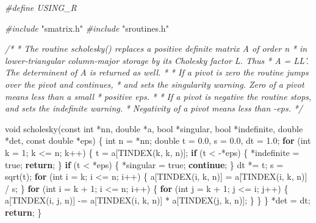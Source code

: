 \documentclass[12pt,]{article}
\newenvironment{Shaded}{\begin{snugshade}}{\end{snugshade}}
\newcommand{\CommentTok}[1]{\textcolor[rgb]{0.56,0.35,0.01}{\textit{#1}}}
\newcommand{\ControlFlowTok}[1]{\textcolor[rgb]{0.13,0.29,0.53}{\textbf{#1}}}
\newcommand{\DataTypeTok}[1]{\textcolor[rgb]{0.13,0.29,0.53}{#1}}
\newcommand{\DecValTok}[1]{\textcolor[rgb]{0.00,0.00,0.81}{#1}}
\newcommand{\FloatTok}[1]{\textcolor[rgb]{0.00,0.00,0.81}{#1}}
\newcommand{\ImportTok}[1]{#1}
\newcommand{\NormalTok}[1]{#1}
\newcommand{\PreprocessorTok}[1]{\textcolor[rgb]{0.56,0.35,0.01}{\textit{#1}}}
\begin{document}
\begin{Shaded}
\begin{Highlighting}[]
\PreprocessorTok{#define USING_R}

\PreprocessorTok{#include }\ImportTok{"smatrix.h"}
\PreprocessorTok{#include }\ImportTok{"sroutines.h"}

\CommentTok{/*}
\CommentTok{ * The routine scholesky() replaces a positive definite matrix A of order n}
\CommentTok{ * in lower-triangular column-major storage by its Cholesky factor L. Thus}
\CommentTok{ * A = LL'. The determinent of A is returned as well.}
\CommentTok{ *}
\CommentTok{ * If a pivot is zero the routine jumps over the pivot and continues,}
\CommentTok{ * and sets the singularity warning. Zero of a pivot means less than a small}
\CommentTok{ * positive eps.}
\CommentTok{ *}
\CommentTok{ * If a pivot is negative the routine stops, and sets the indefinite warning.}
\CommentTok{ * Negativity of a pivot means less than -eps.}
\CommentTok{ */}

\DataTypeTok{void}\NormalTok{ scholesky(}\DataTypeTok{const} \DataTypeTok{int}\NormalTok{ *nn, }\DataTypeTok{double}\NormalTok{ *a, }\DataTypeTok{bool}\NormalTok{ *singular, }\DataTypeTok{bool}\NormalTok{ *indefinite,}
               \DataTypeTok{double}\NormalTok{ *det, }\DataTypeTok{const} \DataTypeTok{double}\NormalTok{ *eps) \{}
  \DataTypeTok{int}\NormalTok{ n = *nn;}
  \DataTypeTok{double}\NormalTok{ t = }\FloatTok{0.0}\NormalTok{, s = }\FloatTok{0.0}\NormalTok{, dt = }\FloatTok{1.0}\NormalTok{;}
  \ControlFlowTok{for}\NormalTok{ (}\DataTypeTok{int}\NormalTok{ k = }\DecValTok{1}\NormalTok{; k <= n; k++) \{}
\NormalTok{    t = a[TINDEX(k, k, n)];}
    \ControlFlowTok{if}\NormalTok{ (t < -*eps) \{}
\NormalTok{      *indefinite = true;}
      \ControlFlowTok{return}\NormalTok{;}
\NormalTok{    \}}
    \ControlFlowTok{if}\NormalTok{ (t < *eps) \{}
\NormalTok{      *singular = true;}
      \ControlFlowTok{continue}\NormalTok{;}
\NormalTok{    \}}
\NormalTok{    dt *= t;}
\NormalTok{    s = sqrt(t);}
    \ControlFlowTok{for}\NormalTok{ (}\DataTypeTok{int}\NormalTok{ i = k; i <= n; i++) \{}
\NormalTok{      a[TINDEX(i, k, n)] = a[TINDEX(i, k, n)] / s;}
\NormalTok{    \}}
    \ControlFlowTok{for}\NormalTok{ (}\DataTypeTok{int}\NormalTok{ i = k + }\DecValTok{1}\NormalTok{; i <= n; i++) \{}
      \ControlFlowTok{for}\NormalTok{ (}\DataTypeTok{int}\NormalTok{ j = k + }\DecValTok{1}\NormalTok{; j <= i; j++) \{}
\NormalTok{        a[TINDEX(i, j, n)] -= a[TINDEX(i, k, n)] * a[TINDEX(j, k, n)];}
\NormalTok{      \}}
\NormalTok{    \}}
\NormalTok{  \}}
\NormalTok{  *det = dt;}
  \ControlFlowTok{return}\NormalTok{;}
\NormalTok{\}}


\end{Highlighting}
\end{Shaded}
\end{document}
